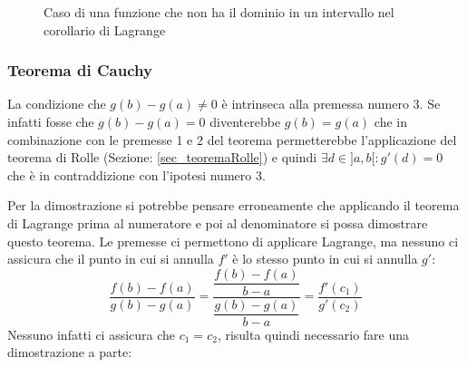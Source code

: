 \begin{figure}[h]
\centering
{}
	\caption{Caso di una funzione che non ha il dominio in un intervallo nel corollario di Lagrange}
	\label{fig_esempioCorollarioLagrange}
\end{figure}


\subsubsection{Teorema di Cauchy} \label{sec_teoremaCauchy}
\thm {
Date due funzioni $f,g:[a,b] \to \mathbb{R}$ con le seguenti proprietà:
\begin{enumerate}
    \item $f,g$ è continue su $[a,b]$
    \item $f,g$ è derivabili su $]a,b[$
    \item $g'(x) \neq 0 \quad \forall x\in ]a,b[$
\end{enumerate}
Allora:
\begin{equation*}
    \exists \,c \in ]a,b[ \;: \dfrac{f(b)-f(a)}{g(b)-g(a)} = \dfrac{f'(c)}{g'(c)}
\end{equation*}
}
La condizione che $g(b) - g(a) \neq 0$ è intrinseca alla premessa numero 3. Se infatti fosse che $g(b) - g(a) = 0$ diventerebbe $g(b) = g(a)$ che in combinazione con le premesse 1 e 2 del teorema permetterebbe l'applicazione del teorema di Rolle (Sezione: \ref{sec_teoremaRolle}) e quindi $\exists d \in ]a,b[ : g'(d) = 0$ che è in contraddizione con l'ipotesi numero 3.

Per la dimostrazione si potrebbe pensare erroneamente che applicando il teorema di Lagrange prima al numeratore e poi al denominatore si possa dimostrare questo teorema. Le premesse ci permettono di applicare Lagrange, ma nessuno ci assicura che il punto in cui si annulla $f'$ è lo stesso punto in cui si annulla $g'$:
\begin{equation*}
	\dfrac{f(b) - f(a)}{g(b) - g(a)} = \dfrac{\dfrac{f(b) - f(a)}{b-a}}{\dfrac{g(b)-g(a)}{b - a}} = \dfrac{f'(c_1)}{g'(c_2)}
\end{equation*}
Nessuno infatti ci assicura che $c_1 = c_2$, risulta quindi necessario fare una dimostrazione a parte:

